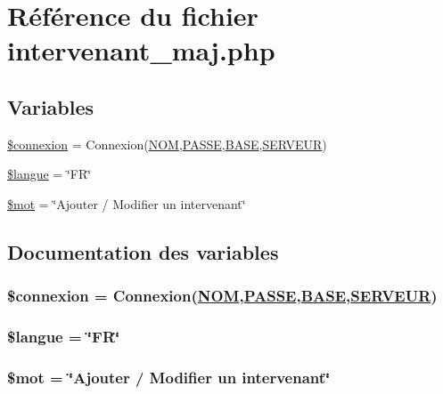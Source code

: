 \hypertarget{intervenant__maj_8php}{
\section{R\'{e}f\'{e}rence du fichier intervenant\_\-maj.php}
\label{intervenant__maj_8php}
}
\subsection*{Variables}
\begin{CompactItemize}
\item 
\hyperlink{intervenant__maj_8php_a0}{\$connexion} = Connexion(\hyperlink{pma__connect_8php_a0}{NOM},\hyperlink{pma__connect_8php_a1}{PASSE},\hyperlink{pma__connect_8php_a3}{BASE},\hyperlink{pma__connect_8php_a2}{SERVEUR})
\item 
\hyperlink{intervenant__maj_8php_a1}{\$langue} = \char`\"{}FR\char`\"{}
\item 
\hyperlink{intervenant__maj_8php_a2}{\$mot} = \char`\"{}Ajouter / Modifier un intervenant\char`\"{}
\end{CompactItemize}


\subsection{Documentation des variables}
\hypertarget{intervenant__maj_8php_a0}{
\subsubsection[\$connexion]{\setlength{\rightskip}{0pt plus 5cm}\$connexion = Connexion(\hyperlink{pma__connect_8php_a0}{NOM},\hyperlink{pma__connect_8php_a1}{PASSE},\hyperlink{pma__connect_8php_a3}{BASE},\hyperlink{pma__connect_8php_a2}{SERVEUR})}}
\label{intervenant__maj_8php_a0}


\hypertarget{intervenant__maj_8php_a1}{
\subsubsection[\$langue]{\setlength{\rightskip}{0pt plus 5cm}\$langue = \char`\"{}FR\char`\"{}}}
\label{intervenant__maj_8php_a1}


\hypertarget{intervenant__maj_8php_a2}{
\subsubsection[\$mot]{\setlength{\rightskip}{0pt plus 5cm}\$mot = \char`\"{}Ajouter / Modifier un intervenant\char`\"{}}}
\label{intervenant__maj_8php_a2}


